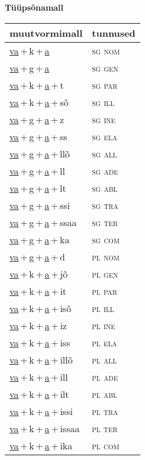 
\vspace{1.8em}
\begin{minipage}{\textwidth}
\textbf{Tüüpsõnamall \,}\\

\begin{sideways}
\begin{tabular}{l l}
muutvormimall & tunnused \\
\hline
\underline{va}\,+\,k\,+\,\underline{a} & \textsc{ sg nom } \\
\underline{va}\,+\,g\,+\,\underline{a} & \textsc{ sg gen } \\
\underline{va}\,+\,k\,+\,\underline{a}\,+\,t & \textsc{ sg par } \\
\underline{va}\,+\,k\,+\,\underline{a}\,+\,sõ & \textsc{ sg ill } \\
\underline{va}\,+\,g\,+\,\underline{a}\,+\,z & \textsc{ sg ine } \\
\underline{va}\,+\,g\,+\,\underline{a}\,+\,ss & \textsc{ sg ela } \\
\underline{va}\,+\,g\,+\,\underline{a}\,+\,llõ & \textsc{ sg all } \\
\underline{va}\,+\,g\,+\,\underline{a}\,+\,ll & \textsc{ sg ade } \\
\underline{va}\,+\,g\,+\,\underline{a}\,+\,lt & \textsc{ sg abl } \\
\underline{va}\,+\,g\,+\,\underline{a}\,+\,ssi & \textsc{ sg tra } \\
\underline{va}\,+\,g\,+\,\underline{a}\,+\,ssaa & \textsc{ sg ter } \\
\underline{va}\,+\,g\,+\,\underline{a}\,+\,ka & \textsc{ sg com } \\
\underline{va}\,+\,g\,+\,\underline{a}\,+\,d & \textsc{ pl nom } \\
\underline{va}\,+\,k\,+\,\underline{a}\,+\,jõ & \textsc{ pl gen } \\
\underline{va}\,+\,k\,+\,\underline{a}\,+\,it & \textsc{ pl par } \\
\underline{va}\,+\,k\,+\,\underline{a}\,+\,isõ & \textsc{ pl ill } \\
\underline{va}\,+\,k\,+\,\underline{a}\,+\,iz & \textsc{ pl ine } \\
\underline{va}\,+\,k\,+\,\underline{a}\,+\,iss & \textsc{ pl ela } \\
\underline{va}\,+\,k\,+\,\underline{a}\,+\,illõ & \textsc{ pl all } \\
\underline{va}\,+\,k\,+\,\underline{a}\,+\,ill & \textsc{ pl ade } \\
\underline{va}\,+\,k\,+\,\underline{a}\,+\,ilt & \textsc{ pl abl } \\
\underline{va}\,+\,k\,+\,\underline{a}\,+\,issi & \textsc{ pl tra } \\
\underline{va}\,+\,k\,+\,\underline{a}\,+\,issaa & \textsc{ pl ter } \\
\underline{va}\,+\,k\,+\,\underline{a}\,+\,ika & \textsc{ pl com } \\
\end{tabular}
\end{sideways}
\label{tab:tüüpsõnamall-vaka}


\end{minipage}
